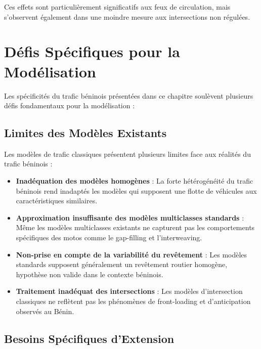 Ces effets sont particulièrement significatifs aux feux de circulation, mais s'observent également dans une moindre mesure aux intersections non régulées.

\section{Défis Spécifiques pour la Modélisation}
\label{sec:defis_modelisation}

Les spécificités du trafic béninois présentées dans ce chapitre soulèvent plusieurs défis fondamentaux pour la modélisation :

\subsection{Limites des Modèles Existants}
\label{subsec:limites_modeles_existants}

Les modèles de trafic classiques présentent plusieurs limites face aux réalités du trafic béninois :

\begin{itemize}
\item \textbf{Inadéquation des modèles homogènes} : La forte hétérogénéité du trafic béninois rend inadaptés les modèles qui supposent une flotte de véhicules aux caractéristiques similaires.

\item \textbf{Approximation insuffisante des modèles multiclasses standards} : Même les modèles multiclasses existants \cite{wong2002multi,chanut2005modeles} ne capturent pas les comportements spécifiques des motos comme le gap-filling et l'interweaving.

\item \textbf{Non-prise en compte de la variabilité du revêtement} : Les modèles standards supposent généralement un revêtement routier homogène, hypothèse non valide dans le contexte béninois.

\item \textbf{Traitement inadéquat des intersections} : Les modèles d'intersection classiques ne reflètent pas les phénomènes de front-loading et d'anticipation observés au Bénin.
\end{itemize}

\subsection{Besoins Spécifiques d'Extension}
\label{subsec:besoins_extension}

